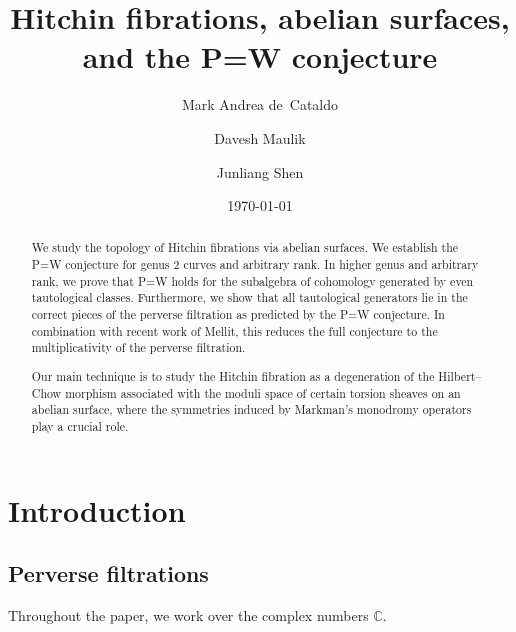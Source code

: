 \documentclass[11pt]{amsart}
\theoremstyle{plain}
\theoremstyle{definition}
\theoremstyle{remark}
\newcommand{\BC}{{\mathbb{C}}}
\begin{document}
\title[Hitchin fibrations, abelian surfaces, and P=W]{Hitchin fibrations, abelian surfaces, \\ and the P=W conjecture}
\date{\today}

\author[M.A. de Cataldo]{Mark Andrea de~Cataldo} 
\address{Stony Brook University}

\author[D. Maulik]{Davesh Maulik}
\address{Massachusetts Institute of Technology}


\author[J. Shen]{Junliang Shen}
\address{Yale University}



\begin{abstract}
We study the topology of Hitchin fibrations via abelian surfaces. We establish the P=W conjecture for genus $2$ curves and arbitrary rank. In higher genus and arbitrary rank, we prove that P=W holds for the subalgebra of cohomology generated by even tautological classes. Furthermore, we show that all tautological generators lie in the correct pieces of the perverse filtration as predicted by the P=W conjecture. In combination with recent work of Mellit, this reduces the full conjecture to the multiplicativity of the perverse filtration. 

Our main technique is to study the Hitchin fibration as a degeneration of the Hilbert--Chow morphism associated with the moduli space of certain torsion sheaves on an abelian surface, where the symmetries induced by Markman's monodromy operators play a crucial role.
\end{abstract}

\baselineskip=14.5pt
\maketitle

\setcounter{tocdepth}{1} 

\tableofcontents
\setcounter{section}{-1}

\section{Introduction}


\subsection{Perverse filtrations}
 Throughout the paper, we work over the complex numbers $\BC$.
 
\end{document}
